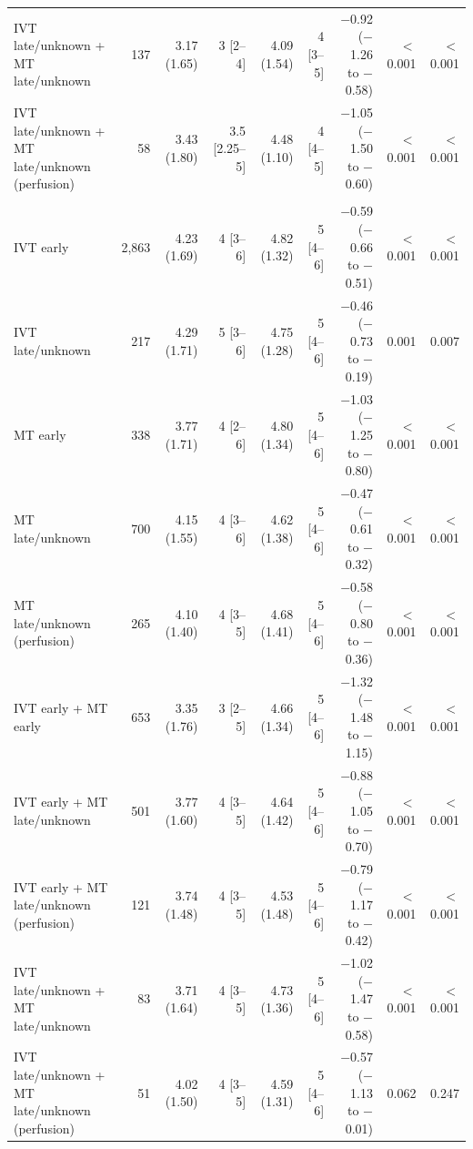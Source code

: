 \begin{landscape}
\begin{longtable}{p{5.6cm}rrrrrrrr}
IVT late/unknown + MT late/unknown & 137 & 3.17 (1.65) & 3 [2--4] & 4.09 (1.54) & 4 [3--5] & $-$0.92 ($-$1.26 to $-$0.58) & $<$0.001 & $<$0.001 \\
IVT late/unknown + MT late/unknown (perfusion) & 58 & 3.43 (1.80) & 3.5 [2.25--5] & 4.48 (1.10) & 4 [4--5] & $-$1.05 ($-$1.50 to $-$0.60) & $<$0.001 & $<$0.001 \\
\addlinespace
\multicolumn{9}{l}{\textbf{NIHSS 21--25}}\\
IVT early & 2,863 & 4.23 (1.69) & 4 [3--6] & 4.82 (1.32) & 5 [4--6] & $-$0.59 ($-$0.66 to $-$0.51) & $<$0.001 & $<$0.001 \\
IVT late/unknown & 217 & 4.29 (1.71) & 5 [3--6] & 4.75 (1.28) & 5 [4--6] & $-$0.46 ($-$0.73 to $-$0.19) & 0.001 & 0.007 \\
MT early & 338 & 3.77 (1.71) & 4 [2--6] & 4.80 (1.34) & 5 [4--6] & $-$1.03 ($-$1.25 to $-$0.80) & $<$0.001 & $<$0.001 \\
MT late/unknown & 700 & 4.15 (1.55) & 4 [3--6] & 4.62 (1.38) & 5 [4--6] & $-$0.47 ($-$0.61 to $-$0.32) & $<$0.001 & $<$0.001 \\
MT late/unknown (perfusion) & 265 & 4.10 (1.40) & 4 [3--5] & 4.68 (1.41) & 5 [4--6] & $-$0.58 ($-$0.80 to $-$0.36) & $<$0.001 & $<$0.001 \\
IVT early + MT early & 653 & 3.35 (1.76) & 3 [2--5] & 4.66 (1.34) & 5 [4--6] & $-$1.32 ($-$1.48 to $-$1.15) & $<$0.001 & $<$0.001 \\
IVT early + MT late/unknown & 501 & 3.77 (1.60) & 4 [3--5] & 4.64 (1.42) & 5 [4--6] & $-$0.88 ($-$1.05 to $-$0.70) & $<$0.001 & $<$0.001 \\
IVT early + MT late/unknown (perfusion) & 121 & 3.74 (1.48) & 4 [3--5] & 4.53 (1.48) & 5 [4--6] & $-$0.79 ($-$1.17 to $-$0.42) & $<$0.001 & $<$0.001 \\
IVT late/unknown + MT late/unknown & 83 & 3.71 (1.64) & 4 [3--5] & 4.73 (1.36) & 5 [4--6] & $-$1.02 ($-$1.47 to $-$0.58) & $<$0.001 & $<$0.001 \\
IVT late/unknown + MT late/unknown (perfusion) & 51 & 4.02 (1.50) & 4 [3--5] & 4.59 (1.31) & 5 [4--6] & $-$0.57 ($-$1.13 to $-$0.01) & 0.062 & 0.247 \\
\end{longtable}
\vspace{-0.5\baselineskip}
\clearpage


\end{landscape}
